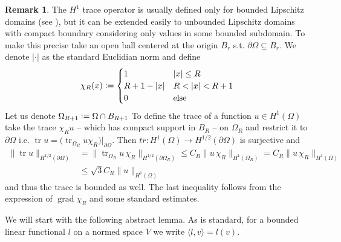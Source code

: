 \documentclass[12pt,a4paper]{article}
\numberwithin{equation}{subsection}
\numberwithin{lemma}{subsection}
\theoremstyle{definition}
\newtheorem{remark}[lemma]{Remark}
\DeclareMathOperator{\grad}{grad}
\DeclareMathOperator{\tr}{tr}
\begin{document}
\begin{remark}
    The $H^1$ trace operator is usually defined only for bounded Lipschitz domains 
    (see \cite[Thm.\,3.9]{monk}), but it can be extended easily to unbounded Lipschitz domains with 
    compact boundary considering only values in some bounded subdomain. 
    To make this precise take an open ball centered at the origin $B_r$
    s.t. $\partial \Omega \subseteq B_r$. We denote $|\cdot |$ as the standard 
    Euclidian norm and
    define 
    \begin{align*}
        \chi_R(x) \vcentcolon= 
        \begin{cases}
            1 & |x| \leq R
            \\ R + 1 - |x| & R < |x| < R+1
            \\ 0 & \text{else}
        \end{cases}        
    \end{align*}
    Let us denote 
    $\Omega_{R+1} \vcentcolon=  \Omega \cap B_{R+1}$
    To define the trace of a function $u \in H^1(\Omega)$ take the trace 
    $\chi_R u$ -- which has compact support in $B_R$ -- 
    on $\Omega_R$ and restrict it to $\partial \Omega$ 
    i.e. $\tr u = \big( \tr_{\Omega_R} u\chi_R \big)|_{\partial \Omega}$.
    Then $tr: H^1(\Omega) \rightarrow H^{1/2}(\partial \Omega)$ is 
    surjective and
    \begin{align*}
        \lVert \tr u \rVert _{H^{1/2}(\partial \Omega)}
        &= \lVert \tr_{\Omega_R} u\,\chi_R  \rVert _{H^{1/2}(\partial \Omega_R)}
        \leq C_R \lVert u\,\chi_R  \rVert _{H^1(\Omega_R)}
        = C_R \lVert u\,\chi_R  \rVert _{H^1(\Omega)}
        \\ &\leq \sqrt{3} C_R \lVert u  \rVert _{H^1(\Omega)}
    \end{align*}
    and thus the trace is bounded as well. The last inequality follows from 
    the expression of $\grad \chi_R$ and some standard estimates.
\end{remark}

We will start with the following abstract lemma. As is standard, for a bounded linear 
functional $l$ on a normed space $V$ we write $\langle l, v \rangle = l(v)$. 
\end{document}
